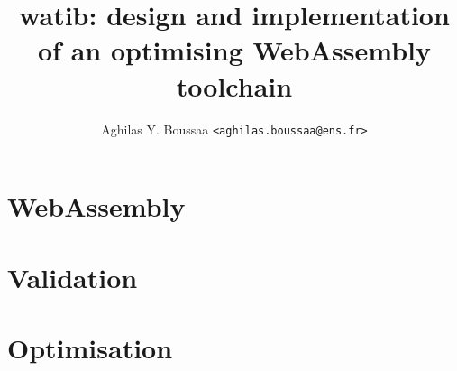 \documentclass[11pt]{article}
\author{Aghilas Y. Boussaa \texttt{<aghilas.boussaa@ens.fr>}}
\title{\textsf{watib}: design and implementation of an optimising WebAssembly toolchain}
\begin{document}
\maketitle
\begin{abstract}

\end{abstract}
\section{WebAssembly}
\section{Validation}
\section{Optimisation}
\end{document}

